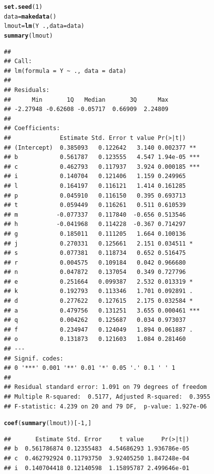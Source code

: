 \documentclass[11pt]{article}\usepackage[]{graphicx}\usepackage[]{color}
\makeatletter
\newcommand{\hlnum}[1]{\textcolor[rgb]{0.686,0.059,0.569}{#1}}%
\newcommand{\hlopt}[1]{\textcolor[rgb]{0,0,0}{#1}}%
\newcommand{\hlstd}[1]{\textcolor[rgb]{0.345,0.345,0.345}{#1}}%
\newcommand{\hlkwb}[1]{\textcolor[rgb]{0.69,0.353,0.396}{#1}}%
\newcommand{\hlkwc}[1]{\textcolor[rgb]{0.333,0.667,0.333}{#1}}%
\newcommand{\hlkwd}[1]{\textcolor[rgb]{0.737,0.353,0.396}{\textbf{#1}}}%
\newenvironment{kframe}{%
 \def\at@end@of@kframe{}%
 \ifinner\ifhmode%
  \def\at@end@of@kframe{\end{minipage}}%
  \begin{minipage}{\columnwidth}%
 \fi\fi%
 \def\FrameCommand##1{\hskip\@totalleftmargin \hskip-\fboxsep
 \colorbox{shadecolor}{##1}\hskip-\fboxsep
     \hskip-\linewidth \hskip-\@totalleftmargin \hskip\columnwidth}%
 \MakeFramed {\advance\hsize-\width
   \@totalleftmargin\z@ \linewidth\hsize
   \@setminipage}}%
 {\par\unskip\endMakeFramed%
 \at@end@of@kframe}
\newenvironment{knitrout}{}{} %
\makeatother
\begin{document}
\begin{knitrout}
\begin{kframe}
\begin{alltt}
\hlkwd{set.seed}\hlstd{(}\hlnum{1}\hlstd{)}
\hlstd{data}\hlkwb{=}\hlkwd{makedata}\hlstd{()}
\hlstd{lmout}\hlkwb{=}\hlkwd{lm}\hlstd{(Y}\hlopt{~}\hlstd{.,}\hlkwc{data}\hlstd{=data)}
\hlkwd{summary}\hlstd{(lmout)}
\end{alltt}
\begin{lstlisting}[basicstyle=\ttfamily,breaklines=true]
## 
## Call:
## lm(formula = Y ~ ., data = data)
## 
## Residuals:
##      Min       1Q   Median       3Q      Max 
## -2.27948 -0.62608 -0.05717  0.66909  2.24809 
## 
## Coefficients:
##              Estimate Std. Error t value Pr(>|t|)    
## (Intercept)  0.385093   0.122642   3.140 0.002377 ** 
## b            0.561787   0.123555   4.547 1.94e-05 ***
## c            0.462793   0.117937   3.924 0.000185 ***
## i            0.140704   0.121406   1.159 0.249965    
## l            0.164197   0.116121   1.414 0.161285    
## p            0.045910   0.116150   0.395 0.693713    
## t            0.059449   0.116261   0.511 0.610539    
## m           -0.077337   0.117840  -0.656 0.513546    
## h           -0.041968   0.114228  -0.367 0.714297    
## g            0.185011   0.111205   1.664 0.100136    
## j            0.270331   0.125661   2.151 0.034511 *  
## s            0.077381   0.118734   0.652 0.516475    
## r            0.004575   0.109184   0.042 0.966680    
## n            0.047872   0.137054   0.349 0.727796    
## e            0.251664   0.099387   2.532 0.013319 *  
## k            0.192793   0.113346   1.701 0.092891 .  
## d            0.277622   0.127615   2.175 0.032584 *  
## a            0.479756   0.131251   3.655 0.000461 ***
## q            0.004262   0.125687   0.034 0.973037    
## f            0.234947   0.124049   1.894 0.061887 .  
## o            0.131873   0.121603   1.084 0.281460    
## ---
## Signif. codes:  
## 0 '***' 0.001 '**' 0.01 '*' 0.05 '.' 0.1 ' ' 1
## 
## Residual standard error: 1.091 on 79 degrees of freedom
## Multiple R-squared:  0.5177,	Adjusted R-squared:  0.3955 
## F-statistic: 4.239 on 20 and 79 DF,  p-value: 1.927e-06
\end{lstlisting}
\begin{alltt}
\hlkwd{coef}\hlstd{(}\hlkwd{summary}\hlstd{(lmout))[}\hlopt{-}\hlnum{1}\hlstd{,]}
\end{alltt}
\begin{lstlisting}[basicstyle=\ttfamily,breaklines=true]
##       Estimate Std. Error     t value     Pr(>|t|)
## b  0.561786874 0.12355483  4.54686293 1.936786e-05
## c  0.462792924 0.11793750  3.92405250 1.847248e-04
## i  0.140704418 0.12140598  1.15895787 2.499646e-01

\end{lstlisting}
\end{kframe}
\end{knitrout}
\end{document}
